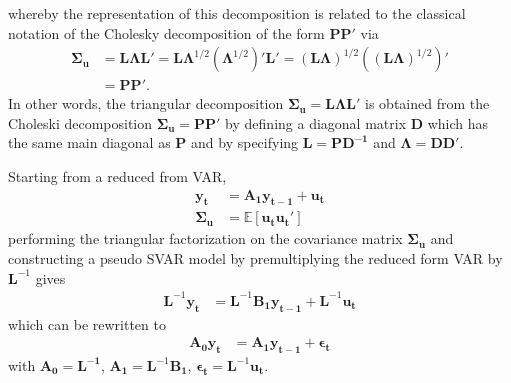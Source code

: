\documentclass[a4paper,11pt,listof=nochaptergap,oneside,pointednumbers,bibtotoc,bigheadings,liststotoc,hidelinks]{scrbook}
\theoremstyle{mysatz}
\theoremstyle{mydefinition}
\theoremstyle{mytheorem}
\theoremstyle{mybemerkung}
\newcommand{\vect}[1]{\boldsymbol{\mathbf{#1}}}
\begin{document}
whereby the representation of this decomposition is related to the classical notation of the Cholesky decomposition of the form $\vect{PP'}$ via
\begin{equation} \label{eq:svar17}
\begin{split}
	\vect{\Sigma_u} & = \vect{L}\vect{\Lambda}\vect{L}' = \vect{L}\vect{\Lambda}^{1/2}(\vect{\Lambda}^{1/2})'\vect{L}' = (\vect{L}\vect{\Lambda})^{1/2}\left ( (\vect{L}\vect{\Lambda})^{1/2}\right )' \\
				& = \vect{P}\vect{P'}.
\end{split}								
\end{equation}
In other words, the triangular decomposition $\vect{\Sigma_u} = \vect{L}\vect{\Lambda}\vect{L'}$ is obtained from the Choleski decomposition $\vect{\Sigma_u} = \vect{P}\vect{P'}$ by defining a diagonal matrix $\vect{D}$ which has the same main diagonal as $\vect{P}$ and by specifying $\vect{L} = \vect{P}\vect{D^{-1}}$ and $\vect{\Lambda} = \vect{D}\vect{D'}$.

Starting from a reduced from VAR,
\begin{equation} \label{eq:svar18}
\begin{split}
	\vect{y_t} & = \vect{A_1}\vect{y_{t-1}} + \vect{u_t} \\
	\vect{\Sigma_u} & = \mathbb{E}[\vect{u_t}\vect{u_t}']
\end{split}								
\end{equation}
performing the triangular factorization on the covariance matrix $\vect{\Sigma_u}$ and constructing a pseudo SVAR model by premultiplying the reduced form VAR by $\vect{L}^{-1}$ gives
\begin{equation} \label{eq:svar19}
\begin{split}
	\vect{L}^{-1}\vect{y_t} & = \vect{L}^{-1}\vect{B_1}\vect{y_{t-1}} + \vect{L}^{-1}\vect{u_t}
\end{split}								
\end{equation}
which can be rewritten to
\begin{equation} \label{eq:svar21}
\begin{split}
	\vect{A_0}\vect{y_t} & = \vect{A_1}\vect{y_{t-1}} + \vect{\epsilon_t}
\end{split}								
\end{equation}
with $\vect{A_0} = \vect{L^{-1}}$, $\vect{A_1} = \vect{L}^{-1}\vect{B_1}$, $\vect{\epsilon_t} = \vect{L}^{-1}\vect{u_t}$.
\end{document}

